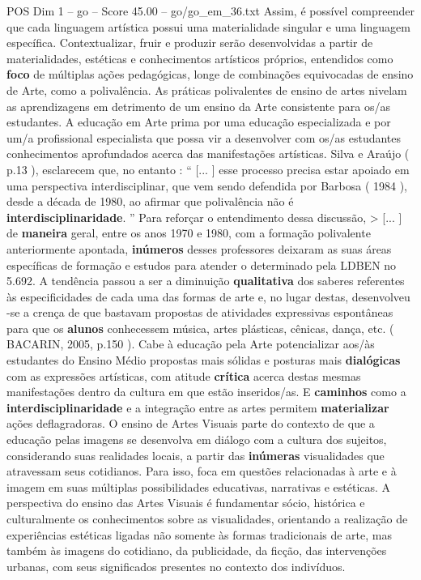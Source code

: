 \begin{textsample}{POS Dim 1 – go – Score 45.00 – go/go\_em\_36.txt}  \label{ex:f1_pos_100}
Assim, é possível compreender que cada linguagem artística possui uma materialidade singular e uma linguagem específica.
Contextualizar, fruir e produzir serão desenvolvidas a partir de materialidades, estéticas e conhecimentos artísticos próprios, entendidos como \textbf{foco} de múltiplas ações pedagógicas, longe de combinações equivocadas de ensino de Arte, como a polivalência.
As práticas polivalentes de ensino de artes nivelam as aprendizagens em detrimento de um ensino da Arte consistente para os/as estudantes.
A educação em Arte prima por uma educação especializada e por um/a profissional especialista que possa vir a desenvolver com os/as estudantes conhecimentos aprofundados acerca das manifestações artísticas.
Silva e Araújo ( p.13 ), esclarecem que, no entanto : “ [... ] esse processo precisa estar apoiado em uma perspectiva interdisciplinar, que vem sendo defendida por Barbosa ( 1984 ), desde a década de 1980, ao afirmar que polivalência não é \textbf{interdisciplinaridade}. ” Para reforçar o entendimento dessa discussão, > [... ] de \textbf{maneira} geral, entre os anos 1970 e 1980, com a formação polivalente anteriormente apontada, \textbf{inúmeros} desses professores deixaram as suas áreas específicas de formação e estudos para atender o determinado pela LDBEN no 5.692.
A tendência passou a ser a diminuição \textbf{qualitativa} dos saberes referentes às especificidades de cada uma das formas de arte e, no lugar destas, desenvolveu -se a crença de que bastavam propostas de atividades expressivas espontâneas para que os \textbf{alunos} conhecessem música, artes plásticas, cênicas, dança, etc. ( BACARIN, 2005, p.150 ).
Cabe à educação pela Arte potencializar aos/às estudantes do Ensino Médio propostas mais sólidas e posturas mais \textbf{dialógicas} com as expressões artísticas, com atitude \textbf{crítica} acerca destas mesmas manifestações dentro da cultura em que estão inseridos/as.
E \textbf{caminhos} como a \textbf{interdisciplinaridade} e a integração entre as artes permitem \textbf{materializar} ações deflagradoras.
O ensino de Artes Visuais parte do contexto de que a educação pelas imagens se desenvolva em diálogo com a cultura dos sujeitos, considerando suas realidades locais, a partir das \textbf{inúmeras} visualidades que atravessam seus cotidianos.
Para isso, foca em questões relacionadas à arte e à imagem em suas múltiplas possibilidades educativas, narrativas e estéticas.
A perspectiva do ensino das Artes Visuais é fundamentar sócio, histórica e culturalmente os conhecimentos sobre as visualidades, orientando a realização de experiências estéticas ligadas não somente às formas tradicionais de arte, mas também às imagens do cotidiano, da publicidade, da ficção, das intervenções urbanas, com seus significados presentes no contexto dos indivíduos.

\end{textsample}
